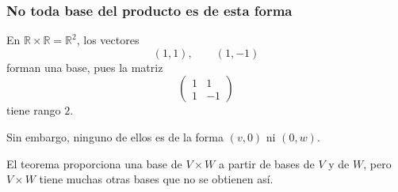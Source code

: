 \begin{frame}
    \frametitle{No toda base del producto es de esta forma}

    \begin{example}
        En $\mathbb{R}\times\mathbb{R}=\mathbb{R}^2$, los vectores
        \[
            (1,1),
            \qquad
            (1,-1)
        \]
        forman una base, pues la matriz
        \[
            \begin{pmatrix}
                1&1\\
                1&-1
            \end{pmatrix}
        \]
        tiene rango $2$.

        Sin embargo, ninguno de ellos es de la forma $(v,0)$ ni $(0,w)$.
    \end{example}

    \medskip

    El teorema proporciona \alert{una} base de $V\times W$ a partir
    de bases de $V$ y de $W$, pero $V\times W$ tiene muchas otras bases
    que no se obtienen así.
\end{frame}
